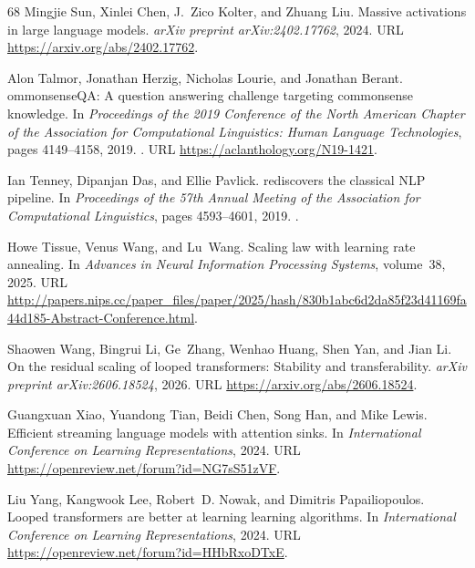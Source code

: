 \documentclass[]{bytedance_seed}
\theoremstyle{definition}
\theoremstyle{remark}
\begin{document}
\begin{thebibliography}{68}
Mingjie Sun, Xinlei Chen, J.~Zico Kolter, and Zhuang Liu.
\newblock Massive activations in large language models.
\newblock \emph{arXiv preprint arXiv:2402.17762}, 2024.
\newblock URL \url{https://arxiv.org/abs/2402.17762}.

Alon Talmor, Jonathan Herzig, Nicholas Lourie, and Jonathan Berant.
ommonsense{QA}: A question answering challenge targeting
  commonsense knowledge.
\newblock In \emph{Proceedings of the 2019 Conference of the North American
  Chapter of the Association for Computational Linguistics: Human Language
  Technologies}, pages 4149--4158, 2019.
\newblock {}.
\newblock URL \url{https://aclanthology.org/N19-1421}.

Ian Tenney, Dipanjan Das, and Ellie Pavlick.
 rediscovers the classical {NLP} pipeline.
\newblock In \emph{Proceedings of the 57th Annual Meeting of the Association
  for Computational Linguistics}, pages 4593--4601, 2019.
\newblock {}.

Howe Tissue, Venus Wang, and Lu~Wang.
\newblock Scaling law with learning rate annealing.
\newblock In \emph{Advances in Neural Information Processing Systems},
  volume~38, 2025.
\newblock URL
  \url{http://papers.nips.cc/paper_files/paper/2025/hash/830b1abc6d2da85f23d41169fa44d185-Abstract-Conference.html}.

Shaowen Wang, Bingrui Li, Ge~Zhang, Wenhao Huang, Shen Yan, and Jian Li.
\newblock On the residual scaling of looped transformers: Stability and
  transferability.
\newblock \emph{arXiv preprint arXiv:2606.18524}, 2026.
\newblock URL \url{https://arxiv.org/abs/2606.18524}.

Guangxuan Xiao, Yuandong Tian, Beidi Chen, Song Han, and Mike Lewis.
\newblock Efficient streaming language models with attention sinks.
\newblock In \emph{International Conference on Learning Representations}, 2024.
\newblock URL \url{https://openreview.net/forum?id=NG7sS51zVF}.

Liu Yang, Kangwook Lee, Robert~D. Nowak, and Dimitris Papailiopoulos.
\newblock Looped transformers are better at learning learning algorithms.
\newblock In \emph{International Conference on Learning Representations}, 2024.
\newblock URL \url{https://openreview.net/forum?id=HHbRxoDTxE}.


\end{thebibliography}
\end{document}
